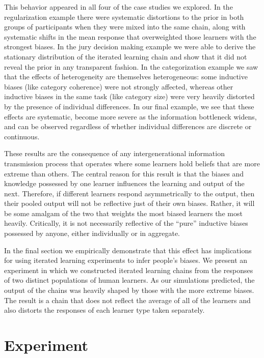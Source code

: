 \documentclass[doc]{apa6}
\begin{document}
This behavior appeared in all four of the case studies we explored. In the regularization example there were systematic distortions to the prior in both groups of participants when they were mixed into the same chain, along with systematic shifts in the mean response that overweighted those learners with the strongest biases. In the jury decision making example we were able to derive the stationary distribution of the iterated learning chain and show that it did not reveal the prior in any transparent fashion. In the categorization example we saw that the effects of heterogeneity are themselves heterogeneous: some inductive biases (like category coherence) were not strongly affected, whereas other inductive biases in the same task (like category size) were very heavily distorted by the presence of individual differences. In our final example, we see that these effects are systematic, become more severe as the information bottleneck widens, and can be observed regardless of whether individual differences are discrete or continuous.

These results are the consequence of any intergenerational information transmission process that operates where some learners hold beliefs that are more extreme than others. The central reason for this result is that the biases and knowledge possessed by one learner influences the learning and output of the next. Therefore, if different learners respond asymmetrically to the output, then their pooled output will not be reflective just of their own biases. Rather, it will be some amalgam of the two that weights the most biased learners the most heavily. Critically, it is not necessarily reflective of the ``pure'' inductive biases possessed by anyone, either individually or in aggregate. 

In the final section we empirically demonstrate that this effect has implications for using iterated learning experiments to infer people's biases. We present an experiment in which we constructed iterated learning chains from the responses of two distinct populations of human learners. As our simulations predicted, the output of the chains was heavily shaped by those with the more extreme biases. The result is a chain that does not reflect the average of all of the learners and also distorts the responses of each learner type taken separately.


\section{Experiment}
\end{document}
